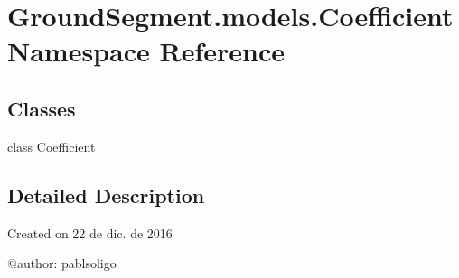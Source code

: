 \hypertarget{namespace_ground_segment_1_1models_1_1_coefficient}{}\section{Ground\+Segment.\+models.\+Coefficient Namespace Reference}
\label{namespace_ground_segment_1_1models_1_1_coefficient}
\subsection*{Classes}
\begin{DoxyCompactItemize}
\item 
class \hyperlink{class_ground_segment_1_1models_1_1_coefficient_1_1_coefficient}{Coefficient}
\end{DoxyCompactItemize}


\subsection{Detailed Description}
\begin{DoxyVerb}Created on 22 de dic. de 2016

@author: pablsoligo
\end{DoxyVerb}
 